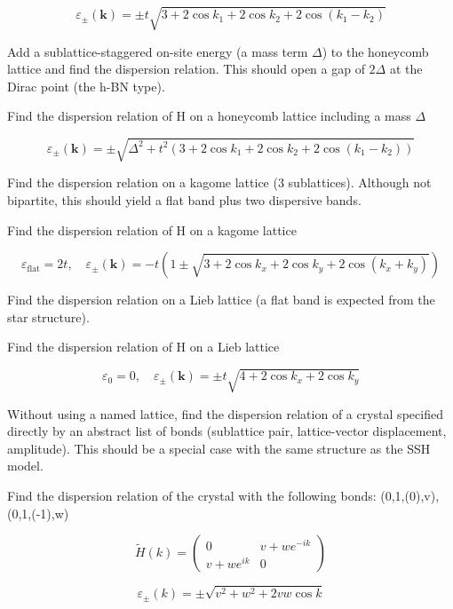 \documentclass[dvipdfmx]{article}
\begin{document}
\begin{equation}
  \varepsilon_\pm(\mathbf{k}) = \pm t \sqrt{ 3 + 2\cos k_1 + 2\cos k_2 + 2\cos(k_1 - k_2) }
  \label{eq:E5}
\end{equation}

Add a sublattice-staggered on-site energy (a mass term $\Delta$) to the honeycomb lattice and find the dispersion relation. This should open a gap of $2\Delta$ at the Dirac point (the h-BN type).

Find the dispersion relation of H on a honeycomb lattice including a mass $\Delta$

\begin{equation}
  \varepsilon_\pm(\mathbf{k}) = \pm \sqrt{ \Delta^2 + t^2 \left( 3 + 2\cos k_1 + 2\cos k_2 + 2\cos(k_1 - k_2) \right) }
  \label{eq:E6}
\end{equation}

Find the dispersion relation on a kagome lattice (3 sublattices). Although not bipartite, this should yield a flat band plus two dispersive bands.

Find the dispersion relation of H on a kagome lattice

\begin{equation}
  \varepsilon_{\mathrm{flat}} = 2t, \quad \varepsilon_\pm(\mathbf{k}) = -t \left( 1 \pm \sqrt{ 3 + 2\cos k_x + 2\cos k_y + 2\cos(k_x + k_y) } \right)
  \label{eq:E7}
\end{equation}

Find the dispersion relation on a Lieb lattice (a flat band is expected from the star structure).

Find the dispersion relation of H on a Lieb lattice

\begin{equation}
  \varepsilon_0 = 0, \quad \varepsilon_\pm(\mathbf{k}) = \pm t \sqrt{ 4 + 2\cos k_x + 2\cos k_y }
  \label{eq:E8}
\end{equation}

Without using a named lattice, find the dispersion relation of a crystal specified directly by an abstract list of bonds (sublattice pair, lattice-vector displacement, amplitude). This should be a special case with the same structure as the SSH model.

Find the dispersion relation of the crystal with the following bonds: (0,1,(0),v),(0,1,(-1),w)

\begin{equation}
  \tilde H(k) = \begin{pmatrix} 0 & v + w e^{-i k} \\ v + w e^{i k} & 0 \end{pmatrix}
  \label{eq:E9}
\end{equation}

\begin{equation}
  \varepsilon_\pm(k) = \pm \sqrt{ v^2 + w^2 + 2 v w \cos k }
  \label{eq:E10}
\end{equation}
\end{document}
